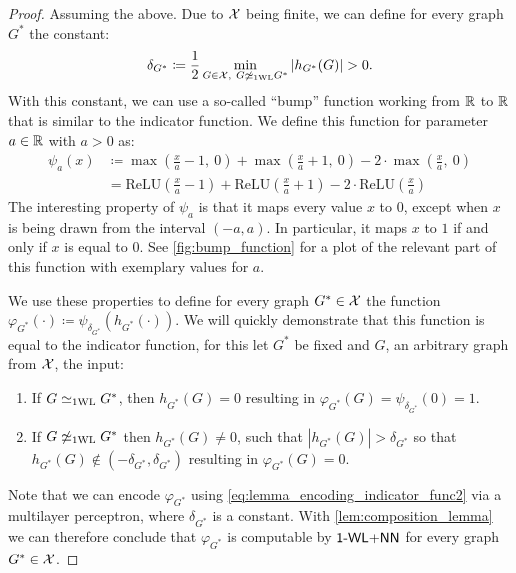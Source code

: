 \begin{proof}
    Assuming the above. Due to $\mathcal{X}$ being finite, we can define for every graph $G^*$ the constant:
    \begin{equation*}
        \delta_{G^*} \coloneqq \frac{1}{2} \min_{G \in \mathcal{X} , \  G \not\simeq_{\text{1WL}} G^*} |h_{G^*}(G)| > 0.
    \end{equation*}
    With this constant, we can use a so-called ``bump'' function working from $\mathbb{R}$ to $\mathbb{R}$ that is similar to the indicator function. We define this function for parameter $a \in \mathbb{R}$ with $a > 0$ as:
    \begin{align}\label{eq:lemma_encoding_indicator_func2}
        \psi_a(x) &\coloneqq \max(\frac{x}{a} -1,\ 0) + \max(\frac{x}{a}+1, \ 0) - 2 \cdot \max(\frac{x}{a}, \ 0) \nonumber\\
        &= \text{ReLU}(\frac{x}{a} -1) + \text{ReLU}(\frac{x}{a}+1) - 2 \cdot \text{ReLU}(\frac{x}{a})
    \end{align}
    The interesting property of $\psi_a$ is that it maps every value $x$ to $0$, except when $x$ is being drawn from the interval $(-a, a)$. In particular, it maps $x$ to $1$ if and only if $x$ is equal to $0$. See \autoref{fig:bump_function} for a plot of the relevant part of this function with exemplary values for $a$.
    
    We use these properties to define for every graph ${G^*} \in \mathcal{X}$ the function $\varphi_{G^*}(\cdot) \coloneqq \psi_{\delta_{G^*}} (h_{G^*}(\cdot))$. 
    We will quickly demonstrate that this function is equal to the indicator function, for this let $G^*$ be fixed and $G$, an arbitrary graph from $\mathcal{X}$, the input:
    \begin{enumerate}
        \item If $G \simeq_{\text{1WL}} G^*$, then $h_{G^*}(G) = 0$ resulting in $\varphi_{G^*}(G) = \psi_{\delta_{G^*}}(0) = 1$.
        \item If $G \not\simeq_{\text{1WL}} G^*$ then $h_{G^*}(G) \neq 0$, such that $|h_{G^*}(G)|> \delta_{G^*}$ so that $h_{G^*}(G) \not\in (-\delta_{G^*}, \delta_{G^*}) $ resulting in $\varphi_{G^*}(G) = 0$.
    \end{enumerate}
    Note that we can encode $\varphi_{G^*}$ using \autoref{eq:lemma_encoding_indicator_func2} via a multilayer perceptron, where $\delta_{G^*}$ is a constant. With \autoref{lem:composition_lemma} we can therefore conclude that $\varphi_{G^*}$ is computable by $\textsf{1-WL+NN}$ for every graph ${G^*} \in \mathcal{X}$.
\end{proof}


